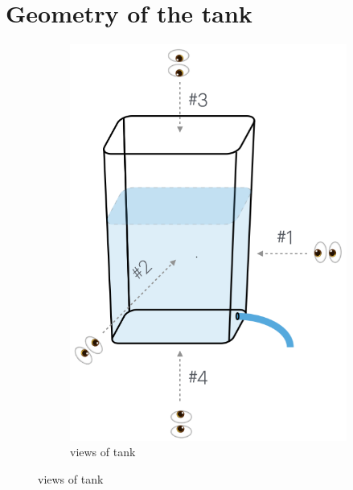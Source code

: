 \documentclass[a4paper,fleqn]{cas-sc}
\begin{document}
\newpage 

\section{Geometry of the tank}

\begin{figure}[h!]
	\centering
	 \begin{subfigure}[b]{0.35\textwidth}
		\includegraphics[width=\textwidth]{../drawings_and_photos/views.png} \caption{views of tank}
	\end{subfigure}
	

\end{figure}
\end{document}
